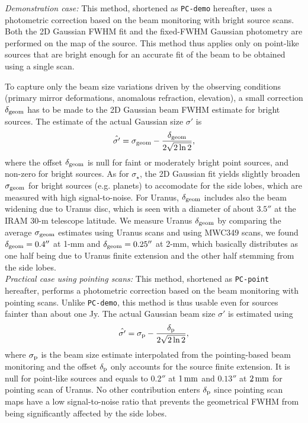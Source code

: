 \noindent \emph{Demonstration case:} This method, shortened as {\tt PC-demo}
hereafter, uses a photometric correction based on the beam monitoring
with bright source scans. Both the 2D Gaussian FWHM fit and the
fixed-FWHM Gaussian photometry are performed on the map of the
source. This method thus applies only on point-like
sources that are bright enough for an accurate fit of the beam to be
obtained using a single scan.

To capture only the beam size variations driven by the
observing conditions (primary mirror deformations, anomalous
refraction, elevation), a small correction $\delta_{\rm{geom}}$ has to be made to
the 2D Gaussian beam FWHM estimate for bright sources. The estimate of the
actual Gaussian size $\sigma '$ is
\begin{equation}
  \hat{\sigma '} = \sigma_{\rm{geom}} - \frac{\delta_{\rm{geom}}}{2\sqrt{2 \ln{2}}}, 
\end{equation} 
where the offset $\delta_{\rm{geom}}$ is null for faint or moderately
bright point sources, and non-zero for bright sources.
As for $\sigma_\star$,  the 2D Gaussian fit yields slightly broaden
$\sigma_{\rm{geom}}$ for bright sources (e.g. planets) to accomodate
for the side lobes, which are measured with high signal-to-noise.
For Uranus, $\delta_{\rm{geom}}$ includes also the beam widening due
to Uranus disc, which is seen with a diameter of about $3.5''$ at the
IRAM 30-m telescope latitude. We measure Uranus $\delta_{\rm{geom}}$
by comparing the average $\sigma_{\rm{geom}}$ estimates using Uranus
scans and using MWC349 scans, we found $\delta_{\rm{geom}} = 0.4''$ at
1-mm and $\delta_{\rm{geom}} = 0.25''$ at 2-mm, which basically
distributes as one half being due to Uranus finite extension and the
other half stemming from the side lobes.\\

\noindent \emph{Practical case using pointing scans:} This method,
shortened as {\tt PC-point} hereafter, performs a photometric correction
based on the beam monitoring with pointing scans. Unlike
{\tt PC-demo}, this method is thus usable even for sources fainter
than about
one Jy. The actual Gaussian beam size $\sigma '$ is estimated using
\begin{equation}
  \hat{\sigma '} = \sigma_{\rm{p}} - \frac{\delta_{\rm{p}}}{2\sqrt{2 \ln{2}}}, 
\end{equation} 
where $\sigma_{\rm{p}}$ is the beam size estimate interpolated from
the pointing-based beam monitoring and the offset $\delta_{\rm{p}}$
only accounts for the source finite extension. It is null for
point-like sources and equals to $0.2''$ at $1\,\rm{mm}$ and $0.13''$
at $2\,\rm{mm}$ for pointing scan of Uranus. No other contribution
enters $\delta_{\rm{p}}$ since pointing scan maps have a low signal-to-noise
ratio that prevents the geometrical FWHM from being significantly affected by the
side lobes.


